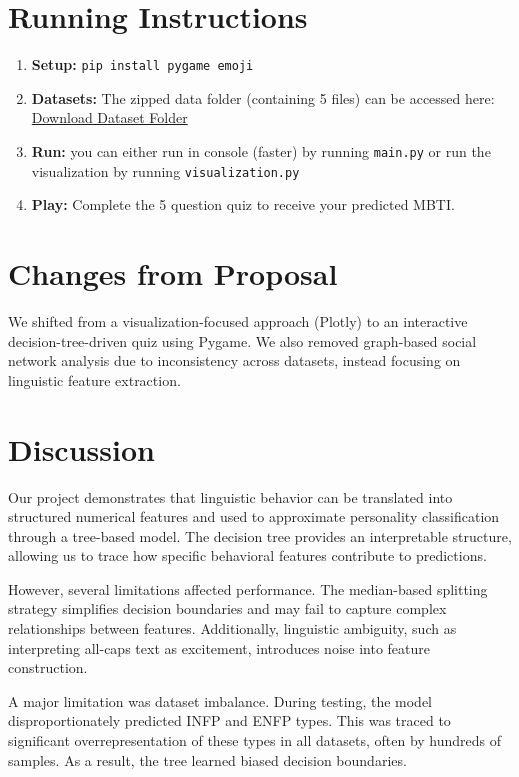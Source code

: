 \documentclass[11pt]{article}
\begin{document}
\section{Running Instructions}
\begin{enumerate}
    \item\textbf{Setup:} \texttt{pip install pygame emoji}
    \item \textbf{Datasets:} The zipped data folder (containing 5 files) can be accessed here: 
    \href{https://utoronto-my.sharepoint.com/:u:/g/personal/laavanya_sahay_mail_utoronto_ca/IQAg2hMP56FhR5gRrcRjxXoSAZ8dM-LCTpVydRMePuGgUgA?e=b5ikZ2}{Download Dataset Folder}
    \item\textbf{Run:} you can either run in console (faster) by running \texttt{main.py} or run the visualization by running \texttt{visualization.py}
    \item\textbf{Play:} Complete the 5 question quiz to receive your predicted MBTI. 
\end{enumerate}

\section{Changes from Proposal}

We shifted from a visualization-focused approach (Plotly) to an interactive decision-tree-driven quiz using Pygame. We also removed graph-based social network analysis due to inconsistency across datasets, instead focusing on linguistic feature extraction.

\section{Discussion}

Our project demonstrates that linguistic behavior can be translated into structured numerical features and used to approximate personality classification through a tree-based model. The decision tree provides an interpretable structure, allowing us to trace how specific behavioral features contribute to predictions.

However, several limitations affected performance. The median-based splitting strategy simplifies decision boundaries and may fail to capture complex relationships between features. Additionally, linguistic ambiguity, such as interpreting all-caps text as excitement, introduces noise into feature construction.

A major limitation was dataset imbalance. During testing, the model disproportionately predicted INFP and ENFP types. This was traced to significant overrepresentation of these types in all datasets, often by hundreds of samples. As a result, the tree learned biased decision boundaries.
\end{document}
